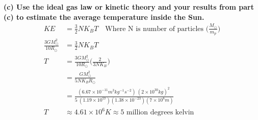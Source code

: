 \documentclass[paper=a4, fontsize=11pt]{scrartcl} %
\numberwithin{equation}{section} %
\numberwithin{figure}{section} %
\numberwithin{table}{section} %
\begin{document}
\textbf{(c) Use the ideal gas law or kinetic theory and your results from part (c) to estimate the
average temperature inside the Sun.}\\
\begin{align*}
KE & = \frac{3}{2} NK_BT \quad \text{Where N is number of particles } \big ( \tfrac{M_{\odot}}{m_p} \big) \\
\frac{3GM^2_{\odot}}{10R_{\odot}} & = \frac{3}{2} NK_BT \\
T & = \frac{3GM^2_{\odot}}{10R_{\odot}} \bigg( \frac{2 }{3 NK_B } \bigg) \\
 & = \frac{GM_{\odot}^2}{5NK_BR_{\odot}}  \\
& = \frac{ (6.67\times 10^{-11}m^3 kg^{-1} s^{-2})\ (2\times 10^{30} kg)^2\ }{5\ (1.19\times 10^{57})(1.38\times 10^{-23}) (7\times 10^8 m)} \\
T & \approx 4.61\times 10^6 K \approx \text{5 million degrees kelvin}
\end{align*}
\end{document}
